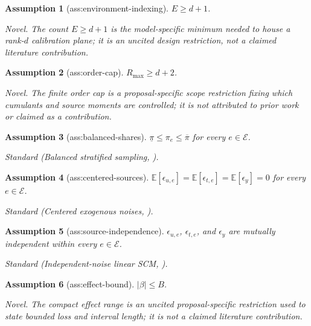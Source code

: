 \documentclass{article}
\newtheorem{assumption}{Assumption}
\begin{document}
\begin{assumption}[ass:environment-indexing]\label{ass:environment-indexing}
\(E\ge d+1\).
\par\smallskip\noindent\emph{Novel.} The count \(E\ge d+1\) is the model-specific minimum needed to house a rank-\(d\) calibration plane; it is an uncited design restriction, not a claimed literature contribution.
\end{assumption}

\begin{assumption}[ass:order-cap]\label{ass:order-cap}
\(R_{\max}\ge d+2\).
\par\smallskip\noindent\emph{Novel.} The finite order cap is a proposal-specific scope restriction fixing which cumulants and source moments are controlled; it is not attributed to prior work or claimed as a contribution.
\end{assumption}

\begin{assumption}[ass:balanced-shares]\label{ass:balanced-shares}
\(\underline\pi\le\pi_e\le\overline\pi\) for every \(e\in\mathcal E\).
\par\smallskip\noindent\emph{Standard} (Balanced stratified sampling, \cite{LongZhuDoHa2023}).
\end{assumption}

\begin{assumption}[ass:centered-sources]\label{ass:centered-sources}
\(\mathbb E[\epsilon_{u,e}]=\mathbb E[\epsilon_{t,e}]=\mathbb E[\epsilon_y]=0\) for every \(e\in\mathcal E\).
\par\smallskip\noindent\emph{Standard} (Centered exogenous noises, \cite{KivvaAkbariSalehkaleybarKiyavash2025}).
\end{assumption}

\begin{assumption}[ass:source-independence]\label{ass:source-independence}
\(\epsilon_{u,e}\), \(\epsilon_{t,e}\), and \(\epsilon_y\) are mutually independent within every \(e\in\mathcal E\).
\par\smallskip\noindent\emph{Standard} (Independent-noise linear SCM, \cite{KivvaAkbariSalehkaleybarKiyavash2025}).
\end{assumption}

\begin{assumption}[ass:effect-bound]\label{ass:effect-bound}
\(\lvert\beta\rvert\le B\).
\par\smallskip\noindent\emph{Novel.} The compact effect range is an uncited proposal-specific restriction used to state bounded loss and interval length; it is not a claimed literature contribution.
\end{assumption}
\end{document}

